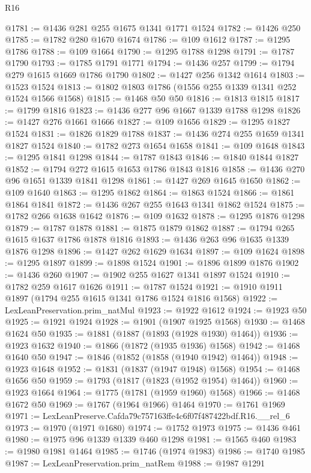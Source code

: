 \begin{lexlean}{R16}
\begin{coremodule}
@1781 := @1436 @281 @255 @1675 @1341 @1771 @1524
@1782 := @1426 @250
@1785 := @1782 @280 @1670 @1674
@1786 := @109 @1612
@1787 := @1295 @1786
@1788 := @109 @1664
@1790 := @1295 @1788 @1298
@1791 := @1787 @1790
@1793 := @1785 @1791 @1771
@1794 := @1436 @257
@1799 := @1794 @279 @1615 @1669 @1786 @1790
@1802 := @1427 @256 @1342 @1614
@1803 := @1523 @1524
@1813 := @1802 @1803 @1786 (@1556 @255 @1339 @1341 @252 @1524 @1566 @1568)
@1815 := @1468 @50 @50
@1816 := @1813 @1815
@1817 := @1799 @1816
@1823 := @1436 @277 @96 @1667 @1339 @1788 @1298
@1826 := @1427 @276 @1661 @1666
@1827 := @109 @1656
@1829 := @1295 @1827 @1524
@1831 := @1826 @1829 @1788
@1837 := @1436 @274 @255 @1659 @1341 @1827 @1524
@1840 := @1782 @273 @1654 @1658
@1841 := @109 @1648
@1843 := @1295 @1841 @1298
@1844 := @1787 @1843
@1846 := @1840 @1844 @1827
@1852 := @1794 @272 @1615 @1653 @1786 @1843 @1816
@1858 := @1436 @270 @96 @1651 @1339 @1841 @1298
@1861 := @1427 @269 @1645 @1650
@1862 := @109 @1640
@1863 := @1295 @1862
@1864 := @1863 @1524
@1866 := @1861 @1864 @1841
@1872 := @1436 @267 @255 @1643 @1341 @1862 @1524
@1875 := @1782 @266 @1638 @1642
@1876 := @109 @1632
@1878 := @1295 @1876 @1298
@1879 := @1787 @1878
@1881 := @1875 @1879 @1862
@1887 := @1794 @265 @1615 @1637 @1786 @1878 @1816
@1893 := @1436 @263 @96 @1635 @1339 @1876 @1298
@1896 := @1427 @262 @1629 @1634
@1897 := @109 @1624
@1898 := @1295 @1897
@1899 := @1898 @1524
@1901 := @1896 @1899 @1876
@1902 := @1436 @260
@1907 := @1902 @255 @1627 @1341 @1897 @1524
@1910 := @1782 @259 @1617 @1626
@1911 := @1787 @1524
@1921 := @1910 @1911 @1897 (@1794 @255 @1615 @1341 @1786 @1524 @1816 @1568)
@1922 := LexLeanPreservation.prim_natMul
@1923 := @1922 @1612
@1924 := @1923 @50
@1925 := @1921 @1924
@1928 := @1901 (@1907 @1925 @1568)
@1930 := @1468 @1624 @50
@1935 := @1881 (@1887 (@1893 (@1928 @1930) @1464))
@1936 := @1923 @1632
@1940 := @1866 (@1872 (@1935 @1936) @1568)
@1942 := @1468 @1640 @50
@1947 := @1846 (@1852 (@1858 (@1940 @1942) @1464))
@1948 := @1923 @1648
@1952 := @1831 (@1837 (@1947 @1948) @1568)
@1954 := @1468 @1656 @50
@1959 := @1793 (@1817 (@1823 (@1952 @1954) @1464))
@1960 := @1923 @1664
@1964 := @1775 (@1781 (@1959 @1960) @1568)
@1966 := @1468 @1672 @50
@1969 := @1767 (@1964 @1966) @1464
@1970 := @1761 @1969
@1971 := LexLeanPreserve.Cafda79c757163ffe4c6f07f487422bdf.R16.__rel_6
@1973 := @1970 (@1971 @1680)
@1974 := @1752 @1973
@1975 := @1436 @461
@1980 := @1975 @96 @1339 @1339 @460 @1298
@1981 := @1565 @460
@1983 := @1980 @1981 @1464
@1985 := @1746 (@1974 @1983)
@1986 := @1740 @1985
@1987 := LexLeanPreservation.prim_natRem
@1988 := @1987 @1291

\end{coremodule}
\end{lexlean}
